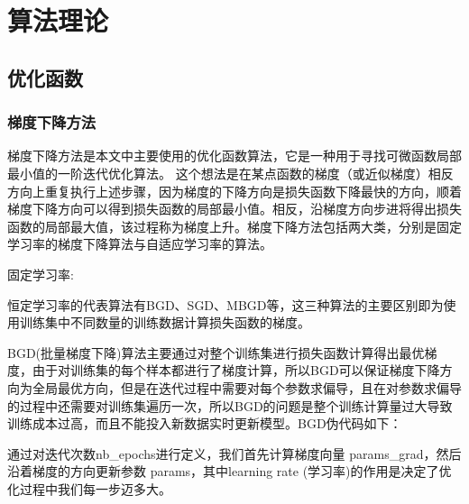 %
%
%
%
%
%

\chapter{算法理论}

\section{优化函数}

\subsection{梯度下降方法}

梯度下降方法是本文中主要使用的优化函数算法，它是一种用于寻找可微函数局部最小值的一阶迭代优化算法。 这个想法是在某点函数的梯度（或近似梯度）相反方向上重复执行上述步骤，因为梯度的下降方向是损失函数下降最快的方向，顺着梯度下降方向可以得到损失函数的局部最小值。相反，沿梯度方向步进将得出损失函数的局部最大值，该过程称为梯度上升。梯度下降方法包括两大类，分别是固定学习率的梯度下降算法与自适应学习率的算法。

固定学习率:

恒定学习率的代表算法有BGD、SGD、MBGD等，这三种算法的主要区别即为使用训练集中不同数量的训练数据计算损失函数的梯度。

BGD(批量梯度下降)算法主要通过对整个训练集进行损失函数计算得出最优梯度，由于对训练集的每个样本都进行了梯度计算，所以BGD可以保证梯度下降方向为全局最优方向，但是在迭代过程中需要对每个参数求偏导，且在对参数求偏导的过程中还需要对训练集遍历一次，所以BGD的问题是整个训练计算量过大导致训练成本过高，而且不能投入新数据实时更新模型。BGD伪代码如下：




通过对迭代次数nb\_epochs进行定义，我们首先计算梯度向量 params\_grad，然后沿着梯度的方向更新参数 params，其中learning rate (学习率)的作用是决定了优化过程中我们每一步迈多大。

